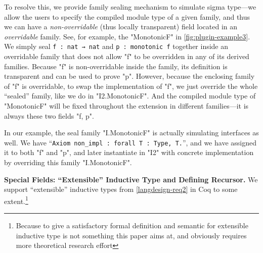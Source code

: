 To resolve this, we provide family sealing mechanism to simulate sigma type---we allow the
users to specify the compiled module type of a given family, and thus we
can have a \textit{non-overridable} (thus locally transparent) field
located in an \textit{overridable} family.
See, for example, the "MonotonicF" in \cref{fig:plugin-example3}.
We simply seal
\texttt{f : nat → nat} and \texttt{p : monotonic f}
together inside an overridable family that does not allow "f"
to be overridden in any of its derived families.
Because "f" is non-overridable inside the family, its definition is
transparent and can be used to prove "p".
However, because the enclosing family of "f" is overridable, to swap the
implementation of "f", we just override the whole ``sealed'' family,
like we do in "I2.MonotonicF". And the compiled module type of
"MonotonicF" will be fixed throughout the extension in different
families---it is always these two fields "f, p".

In our example, the seal family "I.MonotonicF" is actually simulating
interfaces as well.  We have
\mbox{``\texttt{Axiom non_impl : forall {T : Type}, T.}''},
and we have assigned it to both "f" and "p", and later instantiate in
"I2" with concrete implementation by overriding this family
"I.MonotonicF".



\textbf{Special Fields: ``Extensible'' Inductive Type and Defining Recursor.}
We support ``extensible'' inductive types from
\ref{langdesign-req2} in Coq to some extent.\footnote{Because to give a satisfactory formal definition and semantic for extensible inductive type is not something this paper aims at, and obviously requires more theoretical research effort}


